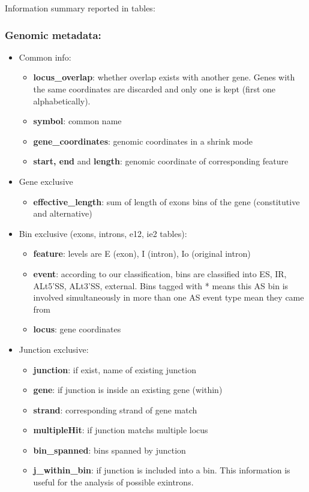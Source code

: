 \documentclass{article}
\begin{document}
Information summary reported in tables:
\subsubsection*{Genomic metadata:}
\begin{itemize}
\item Common info:
    \begin{itemize}
    \item \textbf{locus\_overlap}: whether overlap exists with another gene. Genes with the same coordinates are discarded and only one is kept (first one alphabetically).    
    \item \textbf{symbol}: common name
    \item \textbf{gene\_coordinates}: genomic coordinates in a shrink mode
    \item \textbf{start, end}  and \textbf{length}: genomic coordinate of corresponding feature
  \end{itemize}
\item Gene exclusive 
  \begin{itemize}
  \item \textbf{effective\_length}: sum of length of exons bins of the gene (constitutive and alternative)
  \end{itemize}
\item Bin exclusive (exons, introns, e12, ie2 tables):
\begin{itemize}
    \item \textbf{feature}: levels are E (exon), I (intron), Io (original intron)
    \item \textbf{event}: according to our classification, bins are classified into ES, IR, ALt5'SS, ALt3'SS, external. Bins tagged with * means this AS bin is involved simultaneously in more than one AS event type mean they came from 
  \item \textbf{locus}: gene coordinates
\end{itemize}

\item Junction exclusive:
  \begin{itemize}
  \item \textbf{junction}: if exist, name of existing junction 
   \item \textbf{gene}: if junction is inside  an existing gene (within)
  \item \textbf{strand}: corresponding strand of gene match
  \item \textbf{multipleHit}: if junction matchs multiple locus
  \item \textbf{bin\_spanned}: bins  spanned by junction 
  \item \textbf{j\_within\_bin}: if junction is included  into a bin. This information is useful for the analysis of possible exintrons. 
\end{itemize}
\end{itemize} 
\end{document}
